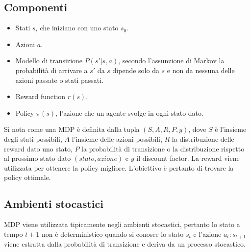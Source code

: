 \subsection{Componenti}
\begin{itemize}
	\item Stati $s_i$ che iniziano con uno stato $s_0$.
	\item Azioni $a$.
	\item Modello di transizione $P(s'|s,a)$, secondo l'assunzione di Markov la probabilit\`a di arrivare a $s'$ da $s$ dipende solo da $s$ e non da nessuna delle azioni passate o stati passati.
	\item Reward function $r(s)$.
	\item Policy $\pi(s)$, l'azione che un agente svolge in ogni stato dato.
\end{itemize}
Si nota come una MDP \`e definita dalla tupla $(S, A, R, P, y)$, dove $S$ \`e l'insieme degli stati possibili, $A$ l'insieme delle azioni possibili, $R$ la distribuzione delle reward dato uno stato, $P$ la probabilit\`a di transizione o la distribuzione rispetto al prossimo stato dato $(stato, azione)$ e $y$ il discount factor.
La reward viene utilizzata per ottenere la policy migliore.
L'obiettivo \`e pertanto di trovare la policy ottimale.

\subsection{Ambienti stocastici}
MDP viene utilizzata tipicamente negli ambienti stocastici, pertanto lo stato a tempo $t+1$ non \`e deterministico quando si conosce lo stato $s_t$ e l'azione $a_t:s_{t+1}$ viene estratta dalla probabilit\`a di transizione e deriva da un processo stocastico.

